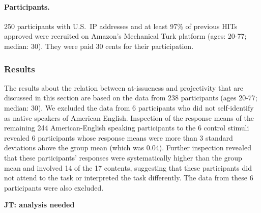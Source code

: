 \documentclass[11pt,fleqn]{article}
\newcommand{\6}{\mbox{$[\hspace*{-.6mm}[$}}
\newcommand{\9}{\mbox{$]\hspace*{-.6mm}]$}}
\newcommand{\jt}[1]{\textbf{\color{blue}JT: #1}}
\begin{document}
\paragraph{Participants.} 250 participants with U.S.\ IP addresses and at least 97\% of previous HITs approved were recruited on Amazon's Mechanical Turk platform (ages: 20-77; median: 30). They were paid 30 cents for their participation.

\subsubsection{Results}

The results about the relation between at-issueness and projectivity that are discussed in this section are based on the data from 238 participants (ages 20-77; median: 30). We excluded the data from 6 participants who did not self-identify as native speakers of American English. Inspection of the response means of the remaining 244 American-English speaking participants to the 6 control stimuli revealed 6 participants whose response means were more than 3 standard deviations above the group mean (which was 0.04). Further inspection revealed that these participants' responses were systematically higher than the group mean and involved 14 of the 17 contents, suggesting that these participants did not attend to the task or interpreted the task differently. The data from these 6 participants were also excluded.

\jt{analysis needed}
\end{document}
